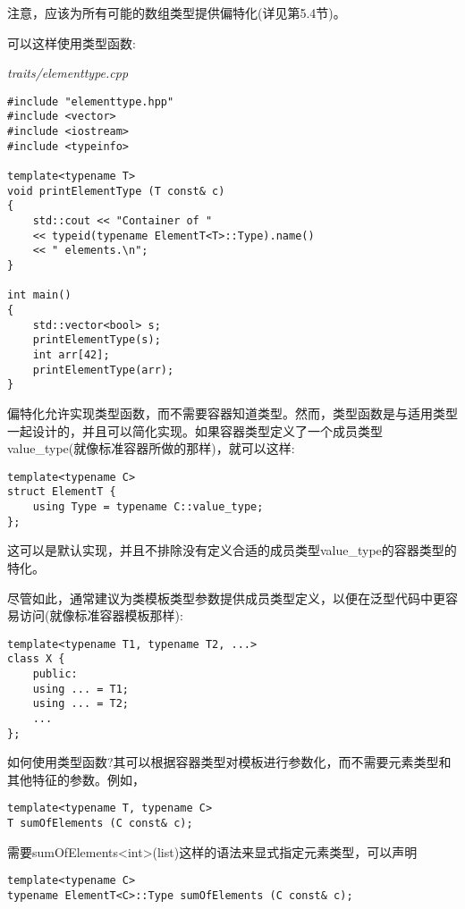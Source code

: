 注意，应该为所有可能的数组类型提供偏特化(详见第5.4节)。

可以这样使用类型函数:

\noindent
\textit{traits/elementtype.cpp}
\begin{lstlisting}[style=styleCXX]
#include "elementtype.hpp"
#include <vector>
#include <iostream>
#include <typeinfo>

template<typename T>
void printElementType (T const& c)
{
	std::cout << "Container of "
	<< typeid(typename ElementT<T>::Type).name()
	<< " elements.\n";
}

int main()
{
	std::vector<bool> s;
	printElementType(s);
	int arr[42];
	printElementType(arr);
}
\end{lstlisting}

偏特化允许实现类型函数，而不需要容器知道类型。然而，类型函数是与适用类型一起设计的，并且可以简化实现。如果容器类型定义了一个成员类型value\_type(就像标准容器所做的那样)，就可以这样:

\begin{lstlisting}[style=styleCXX]
template<typename C>
struct ElementT {
	using Type = typename C::value_type;
};
\end{lstlisting}

这可以是默认实现，并且不排除没有定义合适的成员类型value\_type的容器类型的特化。

尽管如此，通常建议为类模板类型参数提供成员类型定义，以便在泛型代码中更容易访问(就像标准容器模板那样):

\begin{lstlisting}[style=styleCXX]
template<typename T1, typename T2, ...>
class X {
	public:
	using ... = T1;
	using ... = T2;
	...
};
\end{lstlisting}

如何使用类型函数?其可以根据容器类型对模板进行参数化，而不需要元素类型和其他特征的参数。例如，

\begin{lstlisting}[style=styleCXX]
template<typename T, typename C>
T sumOfElements (C const& c);
\end{lstlisting}

需要sumOfElements<int>(list)这样的语法来显式指定元素类型，可以声明

\begin{lstlisting}[style=styleCXX]
template<typename C>
typename ElementT<C>::Type sumOfElements (C const& c);
\end{lstlisting}

